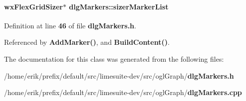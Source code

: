 \paragraph[{sizer\+Marker\+List}]{\setlength{\rightskip}{0pt plus 5cm}wx\+Flex\+Grid\+Sizer$\ast$ dlg\+Markers\+::sizer\+Marker\+List}\label{classdlgMarkers_aba119a505d47eae59955d3480a7a9041}


Definition at line {\bf 46} of file {\bf dlg\+Markers.\+h}.



Referenced by {\bf Add\+Marker()}, and {\bf Build\+Content()}.



The documentation for this class was generated from the following files\+:\begin{DoxyCompactItemize}
\item 
/home/erik/prefix/default/src/limesuite-\/dev/src/ogl\+Graph/{\bf dlg\+Markers.\+h}\item 
/home/erik/prefix/default/src/limesuite-\/dev/src/ogl\+Graph/{\bf dlg\+Markers.\+cpp}\end{DoxyCompactItemize}

